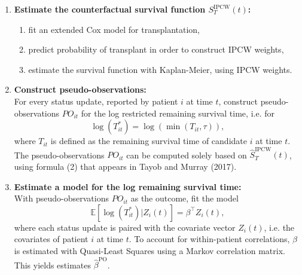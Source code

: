 \documentclass{standalone}
\begin{document}
	
	\begin{tcolorbox}[
		colback=gray!5!white,
		colframe=black,
		title={\textbf{Algorithm B.1: status completion procedure}},
		fonttitle=\bfseries,
		width=1.1\textwidth,
		sharp corners=south,
		boxrule=0.8pt
		]
		\begin{enumerate}[leftmargin=*, itemsep=0.7em]
			\item \textbf{Estimate the counterfactual survival function $S^{\text{IPCW}}_T(t)$:}
			\begin{enumerate}[label=(\alph*)]
				\item fit an extended Cox model for transplantation,
				\item predict probability of transplant in order to construct IPCW weights,
				\item estimate the survival function with Kaplan-Meier, using IPCW weights.
			\end{enumerate}
			
			\item \textbf{Construct pseudo-observations:} \\
			For every status update, reported by patient $i$ at time $t$, construct pseudo-observations $PO_{it}$ for the log restricted remaining survival time, i.e. for $$\log(T^*_{it}) = \log(\min(T_{it}, \tau)),$$ where $T_{it}$ is defined as the remaining survival time of candidate $i$ at time $t$. The pseudo-observations $PO_{it}$ can be computed solely based on $\hat{S}^{\text{IPCW}}_T(t)$, using formula (2) that appears in Tayob and Murray (2017).
			
			\item \textbf{Estimate a model for the log remaining survival time:} \\
			With pseudo-observations $PO_{it}$ as the outcome, fit the model
			\[
			\mathbb{E}[\log(T^*_{it}) | Z_i(t)] = \beta^\intercal Z_i(t),
			\]
			where each status update is paired with the covariate vector $Z_i(t)$, i.e. the covariates of patient $i$ at time $t$. To account for within-patient correlations, $\beta$ is estimated with Quasi-Least Squares using a Markov correlation matrix. This yields estimates $\hat{\beta}^{\text{PO}}$. 
			

\end{enumerate}
\end{tcolorbox}
\end{document}
